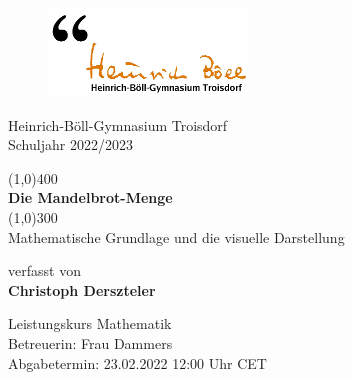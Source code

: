 \begin{center}
  \begin{figure}
    \vspace{-2cm}
    \hspace{-2cm}
    \includegraphics[scale=0.75]{images/heinrichboellgymnasium}
  \end{figure}

  \vspace{1cm}
  Heinrich-Böll-Gymnasium Troisdorf\\
  Schuljahr 2022/2023

  \vspace{1cm}
  \Huge
  \line(1,0){400}\\
  \textbf{Die Mandelbrot-Menge}\\
  \line(1,0){300}\\

  \vspace{0.75cm}
  \Large
  Mathematische Grundlage und die visuelle Darstellung

  \vspace{2cm}
  \large
  verfasst von\\
  \Large
  \textbf{Christoph Derszteler}

  \vfill
  \large
  Leistungskurs Mathematik\\
  Betreuerin: Frau Dammers\\
  Abgabetermin: 23.02.2022 12:00 Uhr CET\\
\end{center}
\thispagestyle{empty}